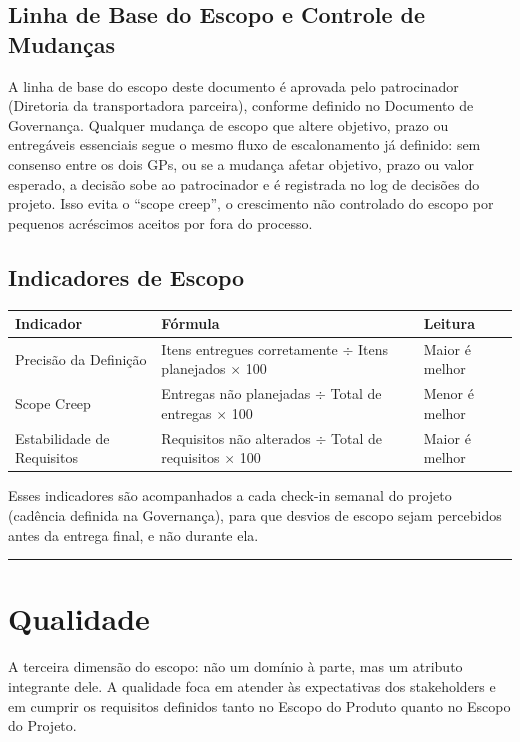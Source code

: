 \documentclass[11pt,a4paper]{article}
\newcommand{\separador}{\par\vspace{2mm}\hrule\vspace{4mm}}
\begin{document}
\subsection{Linha de Base do Escopo e Controle de Mudanças}\label{esc:linhabase}
A linha de base do escopo deste documento é aprovada pelo patrocinador (Diretoria da transportadora parceira), conforme definido no Documento de Governança. Qualquer mudança de escopo que altere objetivo, prazo ou entregáveis essenciais segue o mesmo fluxo de escalonamento já definido: sem consenso entre os dois GPs, ou se a mudança afetar objetivo, prazo ou valor esperado, a decisão sobe ao patrocinador e é registrada no log de decisões do projeto. Isso evita o ``scope creep'', o crescimento não controlado do escopo por pequenos acréscimos aceitos por fora do processo.

\subsection{Indicadores de Escopo}
\begin{center}
\begin{tabularx}{\textwidth}{L l l}
\toprule
\textbf{Indicador} & \textbf{Fórmula} & \textbf{Leitura} \\
\midrule
Precisão da Definição & Itens entregues corretamente $\div$ Itens planejados $\times$ 100 & Maior é melhor \\
Scope Creep & Entregas não planejadas $\div$ Total de entregas $\times$ 100 & Menor é melhor \\
Estabilidade de Requisitos & Requisitos não alterados $\div$ Total de requisitos $\times$ 100 & Maior é melhor \\
\bottomrule
\end{tabularx}
\end{center}

\noindent Esses indicadores são acompanhados a cada check-in semanal do projeto (cadência definida na Governança), para que desvios de escopo sejam percebidos antes da entrega final, e não durante ela.

\separador

\section{Qualidade}\label{esc:qualidade}

\noindent A terceira dimensão do escopo: não um domínio à parte, mas um atributo integrante dele. A qualidade foca em atender às expectativas dos stakeholders e em cumprir os requisitos definidos tanto no Escopo do Produto quanto no Escopo do Projeto.
\end{document}
